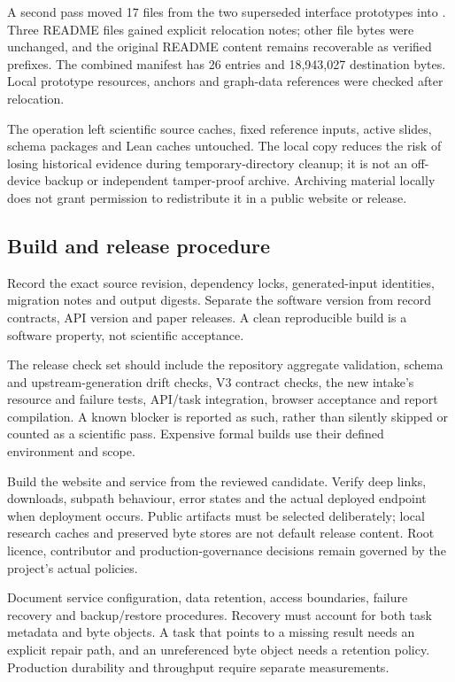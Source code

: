 A second pass moved 17 files from the two superseded interface prototypes into . Three README files gained explicit relocation notes; other file bytes were unchanged, and the original README content remains recoverable as verified prefixes. The combined manifest has 26 entries and 18,943,027 destination bytes. Local prototype resources, anchors and graph-data references were checked after relocation.

The operation left scientific source caches, fixed reference inputs, active slides, schema packages and Lean caches untouched. The local copy reduces the risk of losing historical evidence during temporary-directory cleanup; it is not an off-device backup or independent tamper-proof archive. Archiving material locally does not grant permission to redistribute it in a public website or release.

\subsection{Build and release procedure}

 Record the exact source revision, dependency locks, generated-input identities, migration notes and output digests. Separate the software version from record contracts, API version and paper releases. A clean reproducible build is a software property, not scientific acceptance.

 The release check set should include the repository aggregate validation, schema and upstream-generation drift checks, V3 contract checks, the new intake's resource and failure tests, API/task integration, browser acceptance and report compilation. A known blocker is reported as such, rather than silently skipped or counted as a scientific pass. Expensive formal builds use their defined environment and scope.

 Build the website and service from the reviewed candidate. Verify deep links, downloads, subpath behaviour, error states and the actual deployed endpoint when deployment occurs. Public artifacts must be selected deliberately; local research caches and preserved byte stores are not default release content. Root licence, contributor and production-governance decisions remain governed by the project's actual policies.

 Document service configuration, data retention, access boundaries, failure recovery and backup/restore procedures. Recovery must account for both task metadata and byte objects. A task that points to a missing result needs an explicit repair path, and an unreferenced byte object needs a retention policy. Production durability and throughput require separate measurements.

